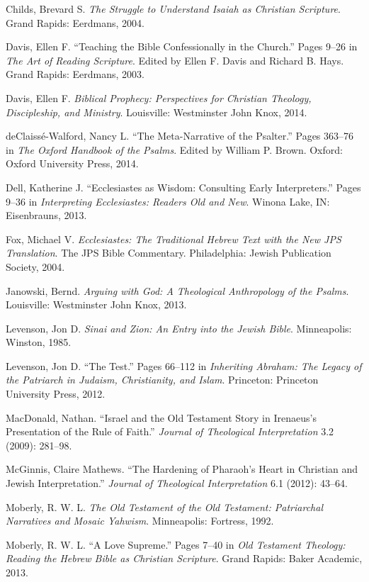 \documentclass[titlepage]{article}
\begin{document}
\begin{thebibliography}{99}
 Childs, Brevard S. \emph{The Struggle to Understand Isaiah as Christian Scripture}. Grand Rapids: Eerdmans, 2004.

 Davis, Ellen F. “Teaching the Bible Confessionally in the Church.” Pages 9–26 in \emph{The Art of Reading Scripture}. Edited by Ellen F. Davis and Richard B. Hays. Grand Rapids: Eerdmans, 2003.

 Davis, Ellen F. \emph{Biblical Prophecy: Perspectives for Christian Theology, Discipleship, and Ministry}. Louisville: Westminster John Knox, 2014.

 deClaissé-Walford, Nancy L. “The Meta-Narrative of the Psalter.” Pages 363–76 in \emph{The Oxford Handbook of the Psalms}. Edited by William P. Brown. Oxford: Oxford University Press, 2014.

 Dell, Katherine J. “Ecclesiastes as Wisdom: Consulting Early Interpreters.” Pages 9–36 in \emph{Interpreting Ecclesiastes: Readers Old and New}. Winona Lake, IN: Eisenbrauns, 2013.

 Fox, Michael V. \emph{Ecclesiastes: The Traditional Hebrew Text with the New JPS Translation}. The JPS Bible Commentary. Philadelphia: Jewish Publication Society, 2004.

 Janowski, Bernd. \emph{Arguing with God: A Theological Anthropology of the Psalms}. Louisville: Westminster John Knox, 2013.

 Levenson, Jon D. \emph{Sinai and Zion: An Entry into the Jewish Bible}. Minneapolis: Winston, 1985.

 Levenson, Jon D. “The Test.” Pages 66–112 in \emph{Inheriting Abraham: The Legacy of the Patriarch in Judaism, Christianity, and Islam}. Princeton: Princeton University Press, 2012.

 MacDonald, Nathan. “Israel and the Old Testament Story in Irenaeus’s Presentation of the Rule of Faith.” \emph{Journal of Theological Interpretation} 3.2 (2009): 281–98.

 McGinnis, Claire Mathews. “The Hardening of Pharaoh’s Heart in Christian and Jewish Interpretation.” \emph{Journal of Theological Interpretation} 6.1 (2012): 43–64.

 Moberly, R. W. L. \emph{The Old Testament of the Old Testament: Patriarchal Narratives and Mosaic Yahwism}. Minneapolis: Fortress, 1992.

 Moberly, R. W. L. “A Love Supreme.” Pages 7–40 in \emph{Old Testament Theology: Reading the Hebrew Bible as Christian Scripture}. Grand Rapids: Baker Academic, 2013.


\end{thebibliography}
\end{document}

